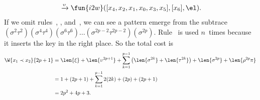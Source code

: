 \begin{itemize}
\begin{equation*}
\begin{array}{@{}r@{\;}c@{\;}l@{}}
        & \xrightarrow{\smash{\upsilon}}
        & \fun{i2w}([x_4,x_2,x_1,x_0,x_3,x_5],[x_6],\el).
      \end{array}
    \end{equation*}
    If we omit rules~\clause{\xi}, \clause{\upsilon}, \clause{\pi}
    and~\clause{\rho}, we can see a pattern emerge from the subtrace
    \((\sigma^2\tau^2)(\sigma^4\tau^4)(\sigma^6\tau^6) \ldots
    (\sigma^{2p-2}\tau^{2p-2})(\sigma^{2p})\). Rule~\clause{\upsilon}
    is used \(n\)~times because it inserts the key in the right
    place. So the total cost is
    \begin{align*}
      \W{x_1 \prec x_2}{2p+1}
        &= \len{\xi} + \len{\upsilon^{2p+1}}
           + \sum_{k=1}^{p-1}{\left(\len{\sigma^{2k}} + \len{\tau^{2k}}\right)}
           + \len{\sigma^{2p}} + \len{\rho^{2p}\pi}\\
        &= 1 + (2p + 1) + \sum_{k=1}^{p-1}{2(2k)} + (2p) + (2p + 1)\\
        &= 2p^2 + 4p + 3.
    \end{align*}


\end{itemize}
